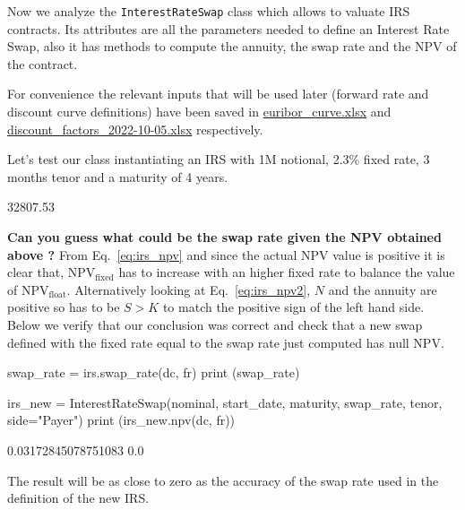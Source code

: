 \begin{finmarkets}
Now we analyze the \texttt{InterestRateSwap} class which allows to valuate IRS contracts. Its attributes are all the parameters needed to define an Interest Rate Swap, also it has methods to compute the annuity, the swap rate and the NPV of the contract.
\end{finmarkets}


For convenience the relevant inputs that will be used later (forward rate and discount curve definitions) have been saved in \href{https://github.com/matteosan1/finance_course/raw/master/input_files/euribor_curve.xlsx}{euribor\_curve.xlsx} and \href{https://github.com/matteosan1/finance_course/raw/master/input_files/discount_factors_2022-10-05.xlsx}{discount\_factors\_2022-10-05.xlsx} respectively.

Let's test our class instantiating an IRS with 1M notional, 2.3\% fixed rate, 3 months tenor and a maturity of 4 years.


\begin{ioutput}
32807.53
\end{ioutput}
\textbf{Can you guess what could be the \textbf{swap rate} given the NPV obtained above ?}
\noindent
From Eq.~\ref{eq:irs_npv} and since the actual NPV value is positive it is clear that, NPV$_{\textrm{fixed}}$ has to increase with an higher fixed rate to balance the value of NPV$_{\textrm{float}}$.
Alternatively looking at Eq.~\ref{eq:irs_npv2}, $N$ and the annuity are positive so has to be $S > K$ to match the positive sign of the left hand side.
Below we verify that our conclusion was correct and check that a new swap defined with the fixed rate equal to the swap rate just computed has null NPV.

\begin{ipythonnon}
swap_rate = irs.swap_rate(dc, fr)
print (swap_rate)

irs_new = InterestRateSwap(nominal, start_date, maturity,
                           swap_rate, tenor, side="Payer")
print (irs_new.npv(dc, fr))
\end{ipythonnon}
\begin{ioutput}
0.03172845078751083
0.0
\end{ioutput}
\noindent
The result will be as close to zero as the accuracy of the swap rate used in the definition of the new IRS.

